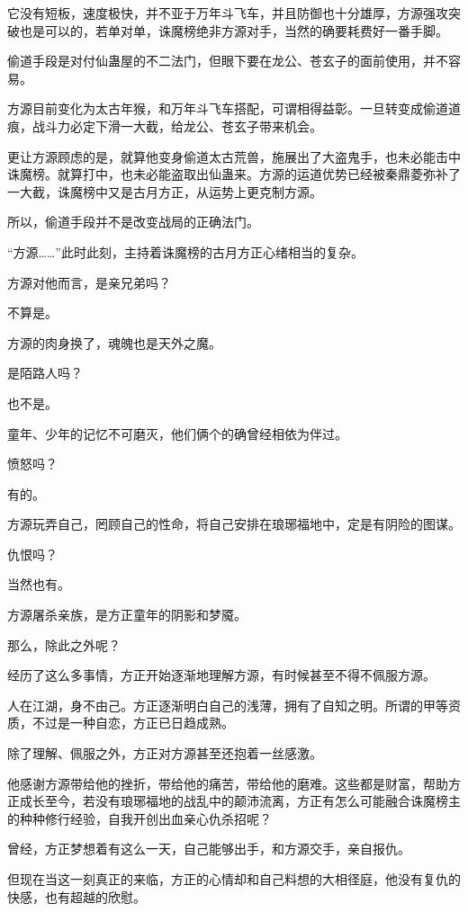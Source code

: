 \begin{this_body}
它没有短板，速度极快，并不亚于万年斗飞车，并且防御也十分雄厚，方源强攻突破也是可以的，若单对单，诛魔榜绝非方源对手，当然的确要耗费好一番手脚。

偷道手段是对付仙蛊屋的不二法门，但眼下要在龙公、苍玄子的面前使用，并不容易。

方源目前变化为太古年猴，和万年斗飞车搭配，可谓相得益彰。一旦转变成偷道道痕，战斗力必定下滑一大截，给龙公、苍玄子带来机会。

更让方源顾虑的是，就算他变身偷道太古荒兽，施展出了大盗鬼手，也未必能击中诛魔榜。就算打中，也未必能盗取出仙蛊来。方源的运道优势已经被秦鼎菱弥补了一大截，诛魔榜中又是古月方正，从运势上更克制方源。

所以，偷道手段并不是改变战局的正确法门。

“方源……”此时此刻，主持着诛魔榜的古月方正心绪相当的复杂。

方源对他而言，是亲兄弟吗？

不算是。

方源的肉身换了，魂魄也是天外之魔。

是陌路人吗？

也不是。

童年、少年的记忆不可磨灭，他们俩个的确曾经相依为伴过。

愤怒吗？

有的。

方源玩弄自己，罔顾自己的性命，将自己安排在琅琊福地中，定是有阴险的图谋。

仇恨吗？

当然也有。

方源屠杀亲族，是方正童年的阴影和梦魇。

那么，除此之外呢？

经历了这么多事情，方正开始逐渐地理解方源，有时候甚至不得不佩服方源。

人在江湖，身不由己。方正逐渐明白自己的浅薄，拥有了自知之明。所谓的甲等资质，不过是一种自恋，方正已日趋成熟。

除了理解、佩服之外，方正对方源甚至还抱着一丝感激。

他感谢方源带给他的挫折，带给他的痛苦，带给他的磨难。这些都是财富，帮助方正成长至今，若没有琅琊福地的战乱中的颠沛流离，方正有怎么可能融合诛魔榜主的种种修行经验，自我开创出血亲心仇杀招呢？

曾经，方正梦想着有这么一天，自己能够出手，和方源交手，亲自报仇。

但现在当这一刻真正的来临，方正的心情却和自己料想的大相径庭，他没有复仇的快感，也有超越的欣慰。


\end{this_body}
